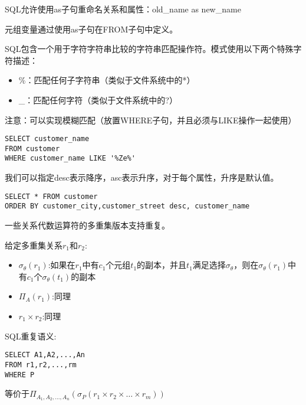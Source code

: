 SQL允许使用as子句重命名关系和属性：old\_name as new\_name

元组变量通过使用as子句在FROM子句中定义。

SQL包含一个用于字符字符串比较的字符串匹配操作符。模式使用以下两个特殊字符描述：
\begin{itemize}
    \item \%：匹配任何子字符串（类似于文件系统中的*）
    \item \_：匹配任何字符（类似于文件系统中的?）
\end{itemize}

注意：可以实现模糊匹配（放置WHERE子句，并且必须与LIKE操作一起使用）
\begin{lstlisting}[style=sqlstyle]
SELECT customer_name
FROM customer
WHERE customer_name LIKE '%Ze%'    
\end{lstlisting}

我们可以指定desc表示降序，asc表示升序，对于每个属性，升序是默认值。
\begin{lstlisting}[style=sqlstyle]
SELECT * FROM customer
ORDER BY customer_city,customer_street desc, customer_name    
\end{lstlisting}

一些关系代数运算符的多重集版本支持重复。

给定多重集关系$r_1$和$r_2$:
\begin{itemize}
    \item $\sigma_\theta(r_1)$:如果在$r_1$中有$c_1$个元组$t_1$的副本，并且$t_1$满足选择$\sigma_\theta$，则在$\sigma_\theta(r_1)$中有$c_1$个$\sigma_\theta(t_1)$的副本 
    \item $\Pi_A(r_1)$:同理
    \item $r_1\times r_2$:同理
\end{itemize}

SQL重复语义:
\begin{lstlisting}[style=sqlstyle]
SELECT A1,A2,...,An 
FROM r1,r2,...,rm 
WHERE P    
\end{lstlisting}

等价于$\Pi_{A_1,A_2,...,A_n}(\sigma_P(r_1\times r_2\times \dots\times r_m))$